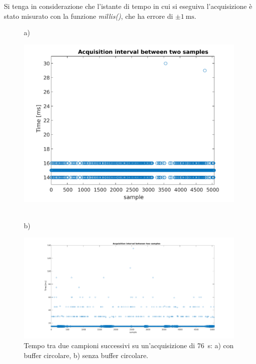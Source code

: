 Si tenga in considerazione che l'istante di tempo in cui si eseguiva l'acquisizione è stato misurato con la funzione \textit{millis()}, che ha errore di $\pm \SI{1}{\milli\second}$. 
\begin{figure}[tbh]
	\centering
	a)
	\begin{minipage}{.900\textwidth}
		\includegraphics[width=0.8\linewidth]{./ImageFiles/interval_time.pdf}
	\end{minipage}
	\\b)
	\begin{minipage}{.900\textwidth}
		\includegraphics[width=\linewidth]{./ImageFiles/interval_time_2}
	\end{minipage}
	\caption{Tempo tra due campioni successivi su un'acquisizione di \SI{76}{\second}: a) con buffer circolare, b) senza buffer circolare.}
	\label{fig:time_interval}
\end{figure}

